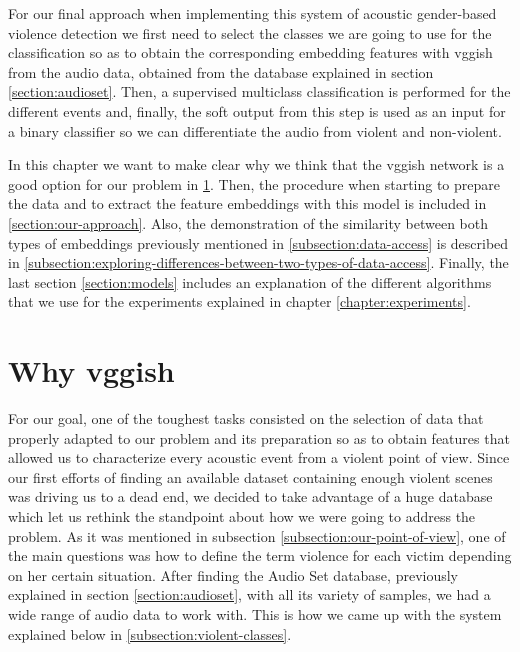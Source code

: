 
	\label{chapter:our-approach-for-avd}
	
	For our final approach when implementing this system of acoustic gender-based violence detection we first need to select the classes we are going to use for the classification so as to obtain the corresponding embedding features with \acrshort{vgg}ish from the audio data, obtained from the database explained in section \ref{section:audioset}. Then, a supervised multiclass classification is performed for the different events and, finally, the soft output from this step is used as an input for a binary classifier so we can differentiate the audio from violent and non-violent.
	
	In this chapter we want to make clear why we think that the \acrshort{vgg}ish network is a good option for our problem in \ref{section:why-vggish}. Then, the procedure when starting to prepare the data and to extract the feature embeddings with this model is included in \ref{section:our-approach}. Also, the demonstration of the similarity between both types of embeddings previously mentioned in \ref{subsection:data-access} is described in \ref{subsection:exploring-differences-between-two-types-of-data-access}. Finally, the last section \ref{section:models} includes an explanation of the different algorithms that we use for the experiments explained in chapter \ref{chapter:experiments}.

\section{Why \acrshort{vgg}ish}
\label{section:why-vggish}

	For our goal, one of the toughest tasks consisted on the selection of data that properly adapted to our problem and its preparation so as to obtain features that allowed us to characterize every acoustic event from a violent point of view. Since our first efforts of finding an available dataset containing enough violent scenes was driving us to a dead end, we decided to take advantage of a huge database which let us rethink the standpoint about how we were going to address the problem. As it was mentioned in subsection \ref{subsection:our-point-of-view}, one of the main questions was how to define the term violence for each victim depending on  her certain situation. After finding the Audio Set database, previously explained in section \ref{section:audioset}, with all its variety of samples, we had a wide range of audio data to work with. This is how we came up with the system explained below in \ref{subsection:violent-classes}.

